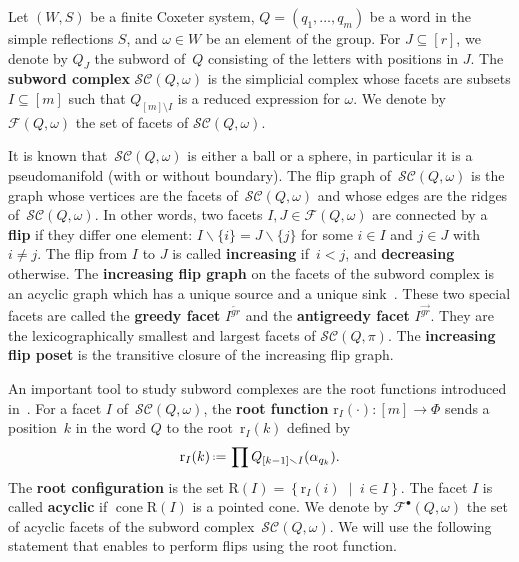 \documentclass[reqno]{amsart}
\theoremstyle{definition}
\newcommand{\set}[2]{\left\{ #1 \;\middle|\; #2 \right\}} %
\newcommand{\ssm}{\smallsetminus} %
\newcommand{\eqdef}{\mbox{\,\raisebox{0.2ex}{\scriptsize\ensuremath{\mathrm:}}\ensuremath{=}\,}} %
\DeclareMathOperator{\cone}{cone} %
\newcommand{\defn}[1]{\textbf{\textsf{\color{PineGreen} #1}}} %
\newcommand{\subwordComplex}{\mathcal{SC}} %
\newcommand{\Roots}{\mathrm{R}} %
\newcommand{\rootFunction}[2]{\mathrm{r}_{#1}(#2)} %
\newcommand{\subwordFacets}{\mathcal{F}} %
\newcommand{\subwordAcyclicFacets}{\mathcal{F}^\bullet} %
\newcommand{\greedyFacet}{I^{\overleftarrow{gr}}} %
\newcommand{\antiGreedyFacet}{I^{\overrightarrow{gr}}} %
\begin{document}
Let $(W,S)$ be a finite Coxeter system, $Q=(q_1,\dots,q_m)$ be a word in the simple reflections $S$, and $\omega \in W$ be an element of the group.
For $J\subseteq [r]$, we denote by $Q_J$ the subword of~$Q$ consisting of the letters with positions in $J$.
The \defn{subword complex} $\subwordComplex(Q,\omega)$ is the simplicial complex whose facets are subsets $I\subseteq [m]$ such that $Q_{[m]\setminus I}$ is a reduced expression for $\omega$.
We denote by $\subwordFacets(Q,\omega)$ the set of facets of $\subwordComplex(Q,\omega)$.

It is known that~$\subwordComplex(Q,\omega)$ is either a ball or a sphere, in particular it is a pseudomanifold (with or without boundary).
The flip graph of~$\subwordComplex(Q,\omega)$ is the graph whose vertices are the facets of~$\subwordComplex(Q,\omega)$ and whose edges are the ridges of~$\subwordComplex(Q,\omega)$.
In other words, two facets $I,J \in \subwordFacets(Q,\omega)$ are connected by a \defn{flip} if they differ one element: $I \ssm \{i\} = J \ssm \{j\}$ for some $i\in I$ and $j\in J$ with~$i \ne j$.
The flip from $I$ to $J$ is called \defn{increasing} if~$i < j$, and \defn{decreasing} otherwise.
The \defn{increasing flip graph} on the facets of the subword complex is an acyclic graph which has a unique source and a unique sink~\cite{Pilaud-greedyFlipTree, PilaudStump-ELlabelings}.
These two special facets are called the \defn{greedy facet} $\greedyFacet$ and the \defn{antigreedy facet} $\antiGreedyFacet$.
They are the lexicographically smallest and largest facets of $\subwordComplex(Q,\pi)$.
The \defn{increasing flip poset} is the transitive closure of the increasing flip graph.

An important tool to study subword complexes are the root functions introduced in~\cite{CeballosLabbeStump}.
For a facet $I$ of~$\subwordComplex(Q,\omega)$, the \defn{root function} $\rootFunction{I}{\cdot}:[m]\rightarrow \Phi$ sends a position~$k$ in the word $Q$ to the root~$ \rootFunction{I}{k}$ defined by 
\[
\rootFunction{I}{k} \eqdef \prod Q_{[k-1]\ssm I}(\alpha_{q_k}).
\]
The \defn{root configuration} is the set $\Roots(I)=\set{\rootFunction{I}{i}}{i\in I}$.
The facet $I$ is called \defn{acyclic} if $\cone \Roots(I)$ is a pointed cone.
We denote by $\subwordAcyclicFacets(Q,\omega)$ the set of acyclic facets of the subword complex~$\subwordComplex(Q,\omega)$.
We will use the following statement that enables to perform flips using the root function.
\end{document}
